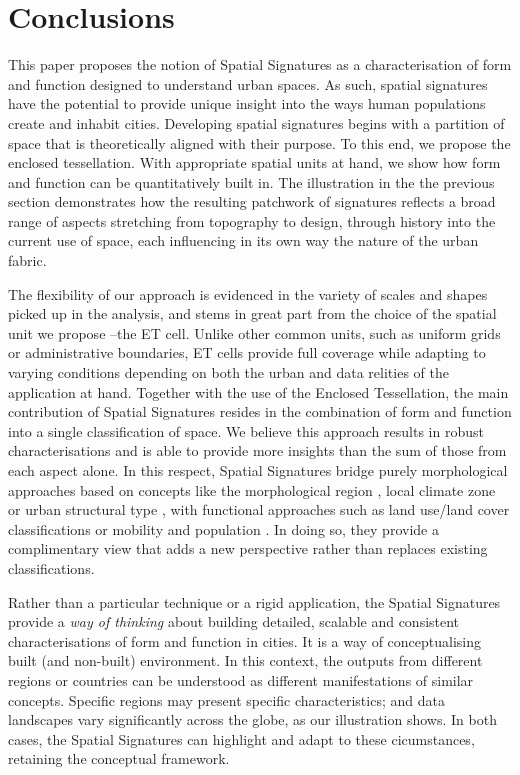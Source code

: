 \section{Conclusions}
\label{sec:conclusions}

This paper proposes the notion of Spatial Signatures as a characterisation of
form and function designed to understand urban spaces.
%
As such,
spatial signatures have the potential to provide unique insight into the ways
human populations create and inhabit cities.
%
Developing spatial signatures begins with a partition of space that is
theoretically aligned with their purpose. To this end, we propose the enclosed
tessellation. With appropriate spatial units at hand, we show how form and
function can be quantitatively built in.
The illustration in the the previous section demonstrates how
the resulting patchwork of signatures reflects a broad range of aspects
stretching from topography to design, through history into the current use
of space, each influencing in its own way the nature of the urban fabric.

The flexibility of our approach is evidenced in the variety of scales and
shapes picked up in the analysis, and stems in great part from the
choice of the spatial unit we propose --the ET cell. Unlike other common
units, such as uniform grids or administrative boundaries, ET cells provide
full coverage while adapting to
varying conditions depending on both the urban and data relities of the
application at hand.
Together with the use of the Enclosed Tessellation, the main contribution of
Spatial Signatures resides in the combination of form and function into a
single classification of space.
%
We believe this approach results in robust characterisations and is able to
provide more insights than the sum of those from each aspect alone.
In this respect, Spatial Signatures bridge
purely morphological approaches based on concepts like the morphological region
\citep{oliveira2020}, local climate zone \citep{stewart2012} or urban
structural type \citep{lehner2019}, with functional approaches such as land
use/land cover classifications \citep{georganos2018very} or mobility and
population \citep{gale2016creating}.
%
In doing so, they provide a complimentary view that adds a new perspective
rather than replaces existing classifications.

Rather than a particular technique or a rigid application, the Spatial
Signatures provide a \textit{way of thinking} about building detailed,
scalable and consistent characterisations of form and function in cities.
It is a way of conceptualising built (and non-built) environment. In this
context, the outputs from different regions or countries can be understood as
different manifestations of similar concepts. Specific
regions may present specific characteristics; and data landscapes vary
significantly across the globe, as our illustration shows. In both cases, the
Spatial Signatures can highlight and adapt to these cicumstances, retaining
the conceptual framework.

